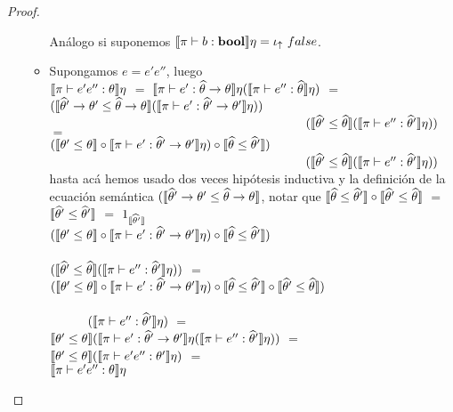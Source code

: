 \begin{proof}
\begin{itemize}
\begin{itemize}
An\'alogo si suponemos $\semBrcks{\pi \vdash b : \boolt}\eta = \iotabot \ false$.

\item Supongamos $e = e'e''$, luego\\

$\llbracket \pi \vdash e'e'' : \theta \rrbracket\eta$ $=$ 
$\llbracket \pi \vdash e' : \widehat{\theta} \rightarrow \theta \rrbracket\eta
							(\llbracket \pi \vdash e'' : \widehat{\theta} \rrbracket\eta)$ $=$\\
$(\llbracket \widehat{\theta}' \rightarrow \theta' \leq \widehat{\theta} \rightarrow \theta \rrbracket
(\llbracket \pi \vdash e' : \widehat{\theta}' \rightarrow \theta' \rrbracket\eta))$\\
\indent \ \ \ \ \ \ \ \ \ \ \ \ \ \ \ \ \ \ \ \ \ \ \ \ \ \ \ \ \ \ \ \ \ \ \ \ \ \ \ \ \
$(\llbracket \widehat{\theta}' \leq \widehat{\theta} \rrbracket(\llbracket \pi \vdash e'' : \widehat{\theta}' \rrbracket\eta))$ $=$\\
$(\llbracket \theta' \leq \theta \rrbracket 
	\circ 
\llbracket \pi \vdash e' : \widehat{\theta}' \rightarrow \theta' \rrbracket\eta)
	\circ
 \llbracket \widehat{\theta} \leq \widehat{\theta}' \rrbracket)$\\
\indent \ \ \ \ \ \ \ \ \ \ \ \ \ \ \ \ \ \ \ \ \ \ \ \ \ \ \ \ \ \ \ \ \ \ \ \ \ \ \ \ \
$(\llbracket \widehat{\theta}' \leq \widehat{\theta} \rrbracket(\llbracket \pi \vdash e'' : \widehat{\theta}' \rrbracket\eta))$\\

hasta ac\'a hemos usado dos veces hip\'otesis inductiva y la definici\'on
de la ecuaci\'on sem\'antica 
$(\llbracket \widehat{\theta}' \rightarrow \theta' \leq \widehat{\theta} \rightarrow \theta \rrbracket$,
notar que 
$\llbracket \widehat{\theta} \leq \widehat{\theta}' \rrbracket \circ \llbracket \widehat{\theta}' \leq \widehat{\theta} \rrbracket$
$=$ $\llbracket \widehat{\theta}' \leq \widehat{\theta}' \rrbracket$ $=$ $1_{\llbracket \widehat{\theta}' \rrbracket}$\\

$(\llbracket \theta' \leq \theta \rrbracket 
	\circ 
\llbracket \pi \vdash e' : \widehat{\theta}' \rightarrow \theta' \rrbracket\eta)
	\circ
 \llbracket \widehat{\theta} \leq \widehat{\theta}' \rrbracket)$\\
\indent \ \ \ \ \ \ \ \ \ \ \ \ \ \ \ \ \ \ \ \ \ \ \ \ \ \ \ \ \ \ \ \ \ \ \ \ \ \ \ \ \
\ \ \ \ \ \ \ \ \ \ \ \
$(\llbracket \widehat{\theta}' \leq \widehat{\theta} \rrbracket(\llbracket \pi \vdash e'' : \widehat{\theta}' \rrbracket\eta))$ $=$\\
$(\llbracket \theta' \leq \theta \rrbracket 
	\circ 
\llbracket \pi \vdash e' : \widehat{\theta}' \rightarrow \theta' \rrbracket\eta)
	\circ
\llbracket \widehat{\theta} \leq \widehat{\theta}' \rrbracket 
 	\circ
\llbracket \widehat{\theta}' \leq \widehat{\theta} \rrbracket)$ \\
\indent \ \ \ \ \ \ \ \ \ \ \ \ \ \ \ \ \ \ \ \ \ \ \ \ \ \ \ \ \ \ \ \ \ \ \ \ \ \ \ \ \
\ \ \ \ \ \ \ \ \ \ \ \ \ \ \ \ \ \ \ \ \ \ \ \ \ \ \ \ \ \
$(\llbracket \pi \vdash e'' : \widehat{\theta}' \rrbracket\eta)$ $=$\\
$\llbracket \theta' \leq \theta \rrbracket 
(\llbracket \pi \vdash e' : \widehat{\theta}' \rightarrow \theta' \rrbracket\eta 
(\llbracket \pi \vdash e'' : \widehat{\theta}' \rrbracket\eta))$ $=$\\
$\llbracket \theta' \leq \theta \rrbracket(\llbracket \pi \vdash e'e'' : \theta' \rrbracket\eta)$ $=$\\
$\llbracket \pi \vdash e'e'' : \theta \rrbracket\eta$


\end{itemize}
\end{itemize}
\end{proof}

